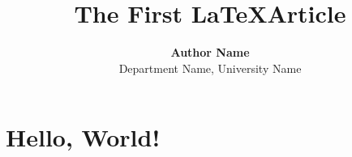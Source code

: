 \documentclass{article}
\title{\textbf{The First  \LaTeX  Article}}
\author{\textbf{Author Name} \\ Department Name, University Name}
\begin{document}
\maketitle

\begin{abstract}
\lipsum[1]
\end{abstract}

\section{Hello, World!}
\lipsum[2-4]
\end{document}
